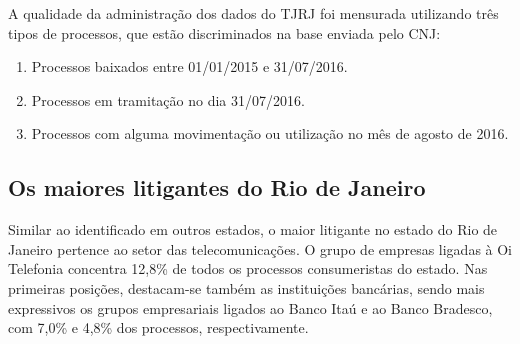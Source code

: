 \documentclass[]{report}
\providecommand{\tightlist}{%
  \setlength{\itemsep}{0pt}\setlength{\parskip}{0pt}}
\begin{document}
A qualidade da administração dos dados do TJRJ foi mensurada utilizando
três tipos de processos, que estão discriminados na base enviada pelo
CNJ:

\begin{enumerate}
\def\labelenumi{\arabic{enumi}.}
\tightlist
\item
  Processos baixados entre 01/01/2015 e 31/07/2016.
\item
  Processos em tramitação no dia 31/07/2016.
\item
  Processos com alguma movimentação ou utilização no mês de agosto de
  2016.
\end{enumerate}

\subsection{Os maiores litigantes do Rio de
Janeiro}\label{os-maiores-litigantes-do-rio-de-janeiro}

Similar ao identificado em outros estados, o maior litigante no estado
do Rio de Janeiro pertence ao setor das telecomunicações. O grupo de
empresas ligadas à Oi Telefonia concentra 12,8\% de todos os processos
consumeristas do estado. Nas primeiras posições, destacam-se também as
instituições bancárias, sendo mais expressivos os grupos empresariais
ligados ao Banco Itaú e ao Banco Bradesco, com 7,0\% e 4,8\% dos
processos, respectivamente.
\end{document}
